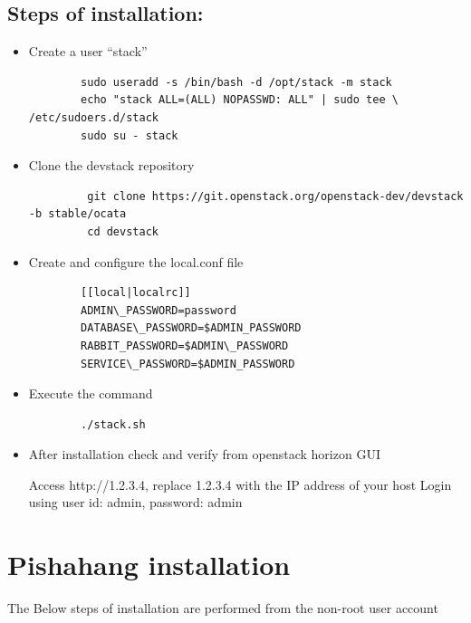 	\subsection*{Steps of installation:}
	\begin{itemize}
		\item Create a user “stack”
		\begin{lstlisting}
		sudo useradd -s /bin/bash -d /opt/stack -m stack
		echo "stack ALL=(ALL) NOPASSWD: ALL" | sudo tee \ /etc/sudoers.d/stack
		sudo su - stack
		\end{lstlisting}
		
		\item Clone the devstack repository
		\begin{lstlisting}
		 git clone https://git.openstack.org/openstack-dev/devstack -b stable/ocata
		 cd devstack
		\end{lstlisting}
		\newpage
		\item Create and configure the local.conf file\\
		\begin{lstlisting}
		[[local|localrc]]
		ADMIN\_PASSWORD=password
		DATABASE\_PASSWORD=$ADMIN_PASSWORD
		RABBIT_PASSWORD=$ADMIN\_PASSWORD
		SERVICE\_PASSWORD=$ADMIN_PASSWORD 	
		\end{lstlisting}
		
		
		\item Execute the command
		\begin{lstlisting}
		./stack.sh
		\end{lstlisting}
		
		\item After installation check and verify from openstack horizon GUI
		
		Access http://1.2.3.4, replace 1.2.3.4 with the IP address of your host
		Login using user id: admin, password: admin
	\end{itemize}
	
	\section{Pishahang installation}
	\label{sec:Pishahang installation}
	The Below steps of installation are performed from the non-root user account
	
